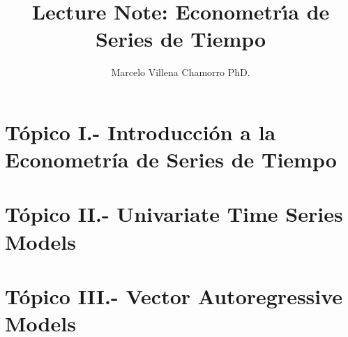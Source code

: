 \documentclass{easyclass}
\begin{document}
\begin{titlepage}
    \title{Lecture Note: Econometr\'\i{}a de Series de Tiempo }
    \author{Marcelo Villena Chamorro PhD.}
    \maketitle
\end{titlepage}

\tableofcontents

\chapter{Tópico I.- Introducción a la Econometría de Series de Tiempo}

\chapter{Tópico II.- Univariate Time Series Models}

\chapter{Tópico III.- Vector Autoregressive Models}



\end{document}
